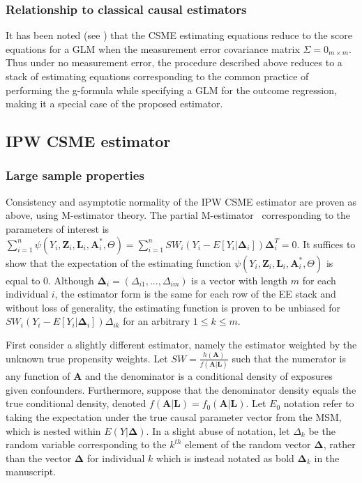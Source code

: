 \documentclass[12pt]{article}
\begin{document}
\subsubsection{Relationship to classical causal estimators}

It has been noted (see \citet{carroll2006}) that the CSME estimating equations reduce to the score equations for a GLM when the measurement error covariance matrix $\Sigma = 0_{m \times m}$. Thus under no measurement error, the procedure described above reduces to a stack of estimating equations corresponding to the common practice of performing the g-formula while specifying a GLM for the outcome regression, making it a special case of the proposed estimator.

\subsection{IPW CSME estimator}

\subsubsection{Large sample properties}

Consistency and asymptotic normality of the IPW CSME estimator are proven as above, using M-estimator theory. The partial M-estimator~\citep{stefanski2002} corresponding to the parameters of interest is $\sum_{i=1}^{n} \psi(Y_{i}, \bm{Z}_{i}, \bm{L}_{i}, \bm{A}^{*}_{i}, \Theta) = \sum_{i=1}^{n} SW_{i}(Y_{i} - E[Y_{i} | \bm{\Delta}_{i}])\bm{\Delta}_{i}^{T} = 0$. It suffices to show that the expectation of the estimating function $\psi(Y_{i}, \bm{Z}_{i}, \bm{L}_{i}, \bm{A}^{*}_{i}, \Theta)$ is equal to 0. Although $\bm{\Delta}_{i} = (\Delta_{i1}, ..., \Delta_{im})$ is a vector with length $m$ for each individual $i$, the estimator form is the same for each row of the EE stack and without loss of generality, the estimating function is proven to be unbiased for $SW_{i}(Y_{i} - E[Y_{i} | \bm{\Delta}_{i}])\Delta_{ik}$ for an arbitrary $1 \leq k \leq m$.

First consider a slightly different estimator, namely the estimator weighted by the unknown true propensity weights. Let $SW = \frac{h(\bm{A})}{f(\bm{A} | \bm{L})}$ such that the numerator is any function of $\bm{A}$ and the denominator is a conditional density of exposures given confounders. Furthermore, suppose that the denominator density equals the true conditional density, denoted $f(\bm{A} | \bm{L}) = f_{0}(\bm{A} | \bm{L})$. Let $E_{0}$ notation refer to taking the expectation under the true causal parameter vector from the MSM, which is nested within $E(Y | \bm{\Delta})$. In a slight abuse of notation, let $\Delta_{k}$ be the random variable corresponding to the $k^{th}$ element of the random vector $\bm{\Delta}$, rather than the vector $\bm{\Delta}$ for individual $k$ which is instead notated as bold $\bm{\Delta}_{k}$ in the manuscript.
\end{document}
